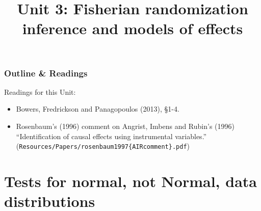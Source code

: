 %

%






\title{Unit 3: Fisherian randomization inference and models of effects}




  \begin{frame}
    \frametitle{Outline \& Readings}

\tableofcontents[subsectionstyle=show/hide/hide]

  \alert{Readings for this Unit:}\\
  \begin{itemize}
  \item Bowers, Fredrickson and Panagopoulos (2013), \S1-4. 
  \item Rosenbaum's (1996) comment on Angrist, Imbens and Rubin's (1996) ``Identification of causal effects using instrumental variables.'' (\texttt{Resources/Papers/rosenbaum1997\{AIRcomment\}.pdf})
  \end{itemize}


\end{frame}

\section{Tests for normal, not Normal, data distributions}


